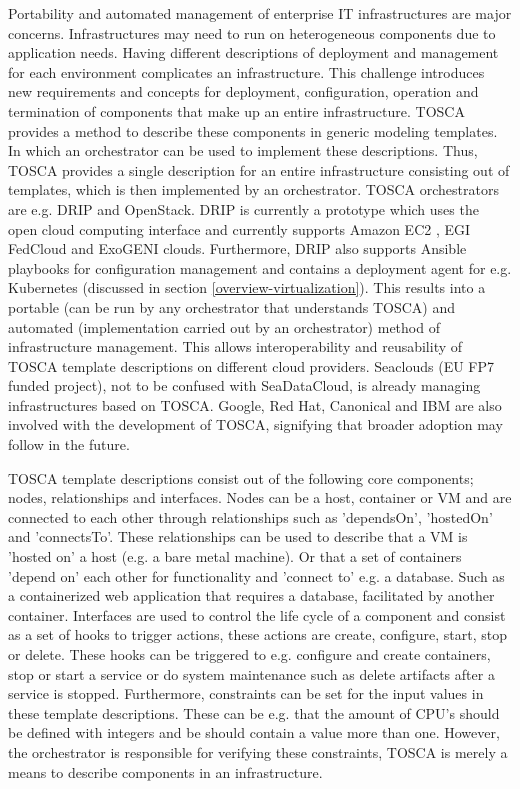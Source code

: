 Portability and automated management of enterprise IT infrastructures are major concerns. Infrastructures may need to run on heterogeneous components due to application needs. Having different descriptions of deployment and management for each environment complicates an infrastructure. This challenge introduces new requirements and concepts for deployment, configuration, operation and termination of components that make up an entire infrastructure. TOSCA provides a method to describe these components in generic modeling templates. In which an orchestrator can be used to implement these descriptions. Thus, TOSCA provides a single description for an entire infrastructure consisting out of templates, which is then implemented by an orchestrator. TOSCA orchestrators are e.g. DRIP and OpenStack. DRIP is currently a prototype which uses the open cloud computing interface and currently supports Amazon EC2 \cite{amazon-website}, EGI FedCloud \cite{egi-website} and ExoGENI \cite{exogeni-website} clouds. Furthermore, DRIP also supports Ansible playbooks \cite{ansible-website} for configuration management and contains a deployment agent for e.g. Kubernetes (discussed in section \ref{overview-virtualization}). This results into a portable (can be run by any orchestrator that understands TOSCA) and automated (implementation carried out by an orchestrator) method of infrastructure management. This allows interoperability and reusability of TOSCA template descriptions on different cloud providers. Seaclouds \cite{seaclouds-website} (EU FP7 funded project), not to be confused with SeaDataCloud, is already managing infrastructures based on TOSCA. Google, Red Hat, Canonical and IBM are also involved with the development of TOSCA, signifying that broader adoption may follow in the future.

TOSCA template descriptions consist out of the following core components; nodes, relationships and interfaces. Nodes can be a host, container or VM and are connected to each other through relationships such as 'dependsOn', 'hostedOn' and 'connectsTo'. These relationships can be used to describe that a VM is 'hosted on' a host (e.g. a bare metal machine). Or that a set of containers 'depend on' each other for functionality and 'connect to' e.g. a database. Such as a containerized web application that requires a database, facilitated by another container. Interfaces are used to control the life cycle of a component and consist as a set of hooks to trigger actions, these actions are create, configure, start, stop or delete. These hooks can be triggered to e.g. configure and create containers, stop or start a service or do system maintenance such as delete artifacts after a service is stopped. Furthermore, constraints can be set for the input values in these template descriptions. These can be e.g. that the amount of CPU's should be defined with integers and be should contain a value more than one. However, the orchestrator is responsible for verifying these constraints, TOSCA is merely a means to describe components in an infrastructure.

